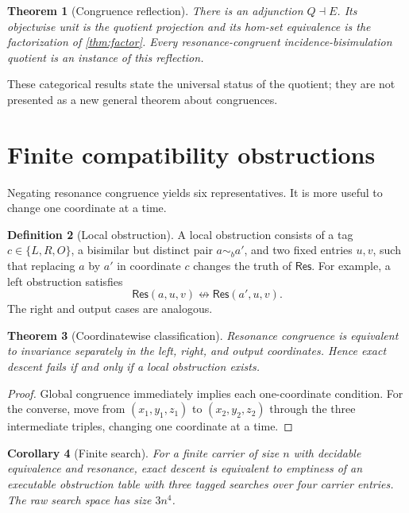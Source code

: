 \documentclass[11pt]{article}
\newtheorem{theorem}{Theorem}[section]
\newtheorem{corollary}[theorem]{Corollary}
\theoremstyle{definition}
\newtheorem{definition}[theorem]{Definition}
\newcommand{\Res}{\mathsf{Res}}
\newcommand{\Bis}{\mathrel{\sim_{\!b}}}
\begin{document}
\begin{theorem}[Congruence reflection]\label{thm:adjunction}
There is an adjunction $Q\dashv E$.  Its objectwise unit is the quotient
projection and its hom-set equivalence is the factorization of
\cref{thm:factor}.  Every resonance-congruent incidence-bisimulation quotient is
an instance of this reflection.
\end{theorem}

These categorical results state the universal status of the quotient; they are
not presented as a new general theorem about congruences.

\section{Finite compatibility obstructions}

Negating resonance congruence yields six representatives.  It is more useful to
change one coordinate at a time.

\begin{definition}[Local obstruction]
A local obstruction consists of a tag $c\in\{L,R,O\}$, a bisimilar but distinct
pair $a\Bis a'$, and two fixed entries $u,v$, such that replacing $a$ by $a'$ in
coordinate $c$ changes the truth of $\Res$.  For example, a left obstruction
satisfies
\[
\Res(a,u,v)\not\leftrightarrow\Res(a',u,v).
\]
The right and output cases are analogous.
\end{definition}

\begin{theorem}[Coordinatewise classification]\label{thm:coordinate}
Resonance congruence is equivalent to invariance separately in the left, right,
and output coordinates.  Hence exact descent fails if and only if a local
obstruction exists.
\end{theorem}
\begin{proof}
Global congruence immediately implies each one-coordinate condition.  For the
converse, move from $(x_1,y_1,z_1)$ to $(x_2,y_2,z_2)$ through the three
intermediate triples, changing one coordinate at a time.
\end{proof}

\begin{corollary}[Finite search]\label{cor:3n4}
For a finite carrier of size $n$ with decidable equivalence and resonance,
exact descent is equivalent to emptiness of an executable obstruction table
with three tagged searches over four carrier entries.  The raw search space has
size $3n^4$.
\end{corollary}
\end{document}
